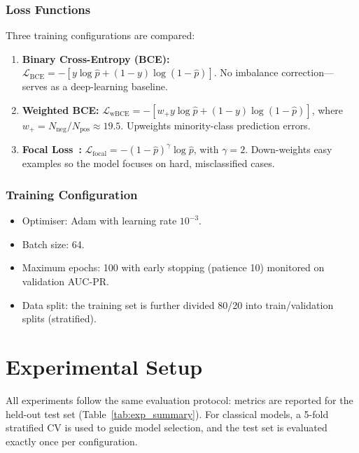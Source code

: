 \documentclass[11pt,a4paper]{article}
\begin{document}
\subsubsection{Loss Functions}

Three training configurations are compared:

\begin{enumerate}
  \item \textbf{Binary Cross-Entropy (BCE):}
        $\mathcal{L}_{\text{BCE}} = -[y\log\hat{p} + (1-y)\log(1-\hat{p})]$.
        No imbalance correction—serves as a deep-learning baseline.

  \item \textbf{Weighted BCE:}
        $\mathcal{L}_{\text{wBCE}} = -[w_+ y\log\hat{p} + (1-y)\log(1-\hat{p})]$,
        where $w_+ = N_{\text{neg}}/N_{\text{pos}} \approx 19.5$.
        Upweights minority-class prediction errors.

  \item \textbf{Focal Loss~\cite{lin2017focal}:}
        $\mathcal{L}_{\text{focal}} = -(1-\hat{p})^\gamma \log\hat{p}$, with $\gamma=2$.
        Down-weights easy examples so the model focuses on hard, misclassified cases.
\end{enumerate}

\subsubsection{Training Configuration}

\begin{itemize}
  \item Optimiser: Adam with learning rate $10^{-3}$.
  \item Batch size: 64.
  \item Maximum epochs: 100 with early stopping (patience 10) monitored on validation AUC-PR.
  \item Data split: the training set is further divided 80/20 into train/validation splits (stratified).
\end{itemize}

\section{Experimental Setup}
\label{sec:experiments}

All experiments follow the same evaluation protocol: metrics are reported for the held-out test set (Table~\ref{tab:exp_summary}).
For classical models, a 5-fold stratified CV is used to guide model selection, and the test set is evaluated exactly once per configuration.
\end{document}
